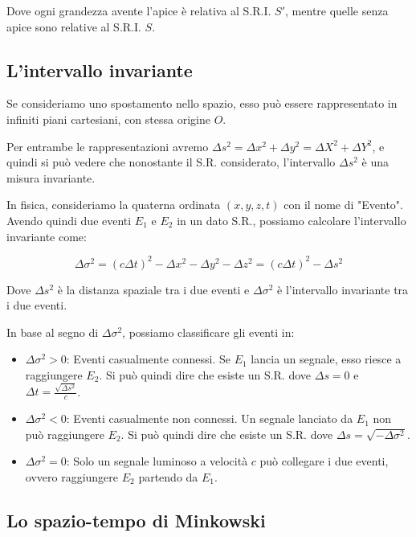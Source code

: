 Dove ogni grandezza avente l'apice è relativa al S.R.I. $S'$, mentre quelle senza apice sono relative al S.R.I. $S$.

\subsection{L'intervallo invariante}

Se consideriamo uno spostamento nello spazio, esso può essere rappresentato in infiniti piani cartesiani, con stessa origine $O$.

Per entrambe le rappresentazioni avremo $\Delta s^2 = \Delta x^2 + \Delta y^2 = \Delta X^2 + \Delta Y^2$, e quindi si può vedere che nonostante il S.R. considerato, l'intervallo $\Delta s^2$ è una misura invariante.

In fisica, consideriamo la quaterna ordinata $(x, y, z, t)$ con il nome di "Evento".
Avendo quindi due eventi $E_1$ e $E_2$ in un dato S.R., possiamo calcolare l'intervallo invariante come:

\begin{equation*}
    \Delta \sigma^2 = (c\Delta t)^2 - \Delta x^2 - \Delta y^2 - \Delta z^2 = (c\Delta t)^2 - \Delta s^2
\end{equation*}

Dove $\Delta s^2$ è la distanza spaziale tra i due eventi e $\Delta \sigma^2$ è l'intervallo invariante tra i due eventi.

In base al segno di $\Delta \sigma^2$, possiamo classificare gli eventi in:

\begin{itemize}
    \item $\Delta \sigma^2 > 0$: Eventi casualmente connessi. Se $E_1$ lancia un segnale, esso riesce a raggiungere $E_2$. Si può quindi dire che esiste un S.R. dove $\Delta s = 0$ e $\Delta t = \frac{\sqrt{\Delta s^2}}{c}$.
    \item $\Delta \sigma^2 < 0$: Eventi casualmente non connessi. Un segnale lanciato da $E_1$ non può raggiungere $E_2$. Si può quindi dire che esiste un S.R. dove $\Delta s = \sqrt{-\Delta \sigma^2}$.
    \item $\Delta \sigma^2 = 0$: Solo un segnale luminoso a velocità $c$ può collegare i due eventi, ovvero raggiungere $E_2$ partendo da $E_1$.
\end{itemize}

\subsection{Lo spazio-tempo di Minkowski}

